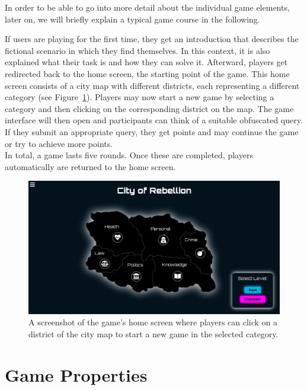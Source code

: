 In order to be able to go into more detail about the individual game elements, later on, we will briefly explain a typical game course in the following.\par
If users are playing for the first time, they get an introduction that describes the fictional scenario in which they find themselves. In this context, it is also explained what their task is and how they can solve it. Afterward, players get redirected back to the home screen, the starting point of the game. This home screen consists of a city map with different districts, each representing a different category (see Figure~\ref{fig:city}). Players may now start a new game by selecting a category and then clicking on the corresponding district on the map. The game interface will then open and participants can think of a suitable obfuscated query. If they submit an appropriate query, they get points and may continue the game or try to achieve more points.\\
In total, a game lasts five rounds. Once these are completed, players automatically are returned to the home screen. 
\begin{figure}[h]
    \includegraphics[width=1.0\textwidth]{graphics/game/city_levels.pdf}
    \caption{A screenshot of the game's home screen where players can click on a district of the city map to start a new game in the selected category.}
    \label{fig:city}
\end{figure}

\section{Game Properties}
